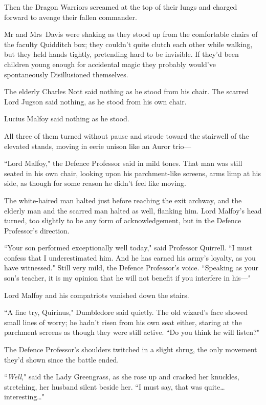 Then the Dragon Warriors screamed at the top of their lungs and charged forward to avenge their fallen commander.

\later

Mr and Mrs~Davis were shaking as they stood up from the comfortable chairs of the faculty Quidditch box; they couldn't quite clutch each other while walking, but they held hands tightly, pretending hard to be invisible. If they'd been children young enough for accidental magic they probably would've spontaneously Disillusioned themselves.

The elderly Charles Nott said nothing as he stood from his chair. The scarred Lord Jugson said nothing, as he stood from his own chair.

Lucius Malfoy said nothing as he stood.

All three of them turned without pause and strode toward the stairwell of the elevated stands, moving in eerie unison like an Auror trio—

``Lord Malfoy," the Defence Professor said in mild tones. That man was still seated in his own chair, looking upon his parchment-like screens, arms limp at his side, as though for some reason he didn't feel like moving.

The white-haired man halted just before reaching the exit archway, and the elderly man and the scarred man halted as well, flanking him. Lord Malfoy's head turned, too slightly to be any form of acknowledgement, but in the Defence Professor's direction.

``Your son performed exceptionally well today," said Professor Quirrell. ``I must confess that I underestimated him. And he has earned his army's loyalty, as you have witnessed." Still very mild, the Defence Professor's voice. ``Speaking as your son's teacher, it is my opinion that he will not benefit if you interfere in his—"

Lord Malfoy and his compatriots vanished down the stairs.

``A fine try, Quirinus," Dumbledore said quietly. The old wizard's face showed small lines of worry; he hadn't risen from his own seat either, staring at the parchment screens as though they were still active. ``Do you think he will listen?"

The Defence Professor's shoulders twitched in a slight shrug, the only movement they'd shown since the battle ended.

``\emph{Well}," said the Lady Greengrass, as she rose up and cracked her knuckles, stretching, her husband silent beside her. ``I must say, that was quite…interesting…"

